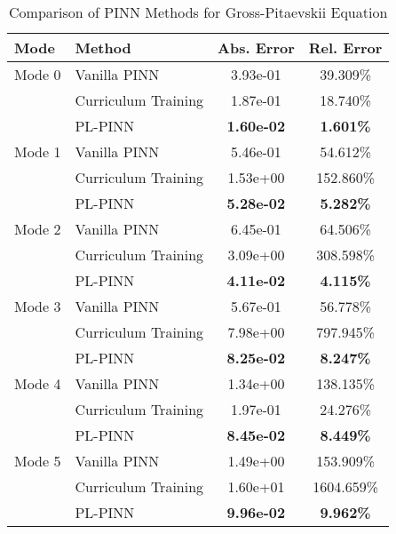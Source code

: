 \begin{table}[htbp]
\centering
\caption{Comparison of PINN Methods for Gross-Pitaevskii Equation}
\label{tab:pinn_comparison}
\begin{tabular}{llcc}
\toprule
Mode & Method & Abs. Error & Rel. Error \\
\midrule
Mode 0 & Vanilla PINN & 3.93e-01 & 39.309\% \\
 & Curriculum Training & 1.87e-01 & 18.740\% \\
 & PL-PINN & \textbf{1.60e-02} & \textbf{1.601\%} \\
\midrule
Mode 1 & Vanilla PINN & 5.46e-01 & 54.612\% \\
 & Curriculum Training & 1.53e+00 & 152.860\% \\
 & PL-PINN & \textbf{5.28e-02} & \textbf{5.282\%} \\
\midrule
Mode 2 & Vanilla PINN & 6.45e-01 & 64.506\% \\
 & Curriculum Training & 3.09e+00 & 308.598\% \\
 & PL-PINN & \textbf{4.11e-02} & \textbf{4.115\%} \\
\midrule
Mode 3 & Vanilla PINN & 5.67e-01 & 56.778\% \\
 & Curriculum Training & 7.98e+00 & 797.945\% \\
 & PL-PINN & \textbf{8.25e-02} & \textbf{8.247\%} \\
\midrule
Mode 4 & Vanilla PINN & 1.34e+00 & 138.135\% \\
 & Curriculum Training & 1.97e-01 & 24.276\% \\
 & PL-PINN & \textbf{8.45e-02} & \textbf{8.449\%} \\
\midrule
Mode 5 & Vanilla PINN & 1.49e+00 & 153.909\% \\
 & Curriculum Training & 1.60e+01 & 1604.659\% \\
 & PL-PINN & \textbf{9.96e-02} & \textbf{9.962\%} \\
\bottomrule
\end{tabular}
\end{table}